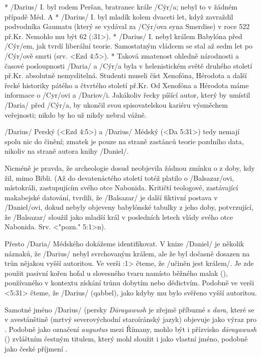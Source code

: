 * \x/Darius/ I. byl rodem Peršan, bratranec krále \x/Cýr/a; nebyl to v žádném případě Méd.
  \insertCite A\right
* \x/Darius/ I. byl mladík kolem dvaceti let, když zavraždil podvodníka Gaumatu (který se vydával za \x/Cýr/ova syna Smerdise) v roce 522 př.Kr.  Nemohlo mu být 62 (:31>). 
* \x/Darius/ I. nebyl králem Babylóna před \x/Cýr/em, jak tvrdí liberální teorie. Samostatným vládcem se stal až sedm let po \x/Cýr/ově smrti (srv. <Ezd 4:5>).
* Taková zmatenost ohledně národnosti a časové posloupnosti \x/Daria/ a \x/Cýr/a byla v helenistickém světě druhého století př.Kr. absolutně nemyslitelná.
Studenti museli číst Xenofóna,  Hérodota a další řecké historiky pátého a čtvrtého století př.Kr. Od Xenofóna a Hérodota máme informace o \x/Cyr/ovi a \x/Dariov/i.
Jakákoliv řecky píšící autor, který by umístil \x/Daria/ před \x/Cýr/a, by ukončil svou spisovatelskou kariéru výsměchem veřejnosti; nikdo by ho už nikdy nebral vážně.  

\enditems

\x/Darius/ Perský (<Ezd 4:5>) a \x/Darius/ Médský (<Da 5:31>) tedy nemají spolu nic do činění; zmatek je pouze na straně zastánců teorie pozdního data, nikoliv na straně autora knihy \x/Daniel/.

Nicméně je pravda, že archeologie dosud neobjevila žádnou zmínku o  z doby, kdy žil, mimo Bibli.
(Až do devatenáctého století totéž platilo o \x/Balsazar/ovi, místokráli, zastupujícím svého otce Nabonida. Kritičtí teologové, zastávající makabejské datování, tvrdili, že
\x/Balsazar/ je další fiktivní postava v \x/Daniel/ovi, dokud nebyly objeveny babylónské tabulky z jeho doby,  potvrzující, že \x/Balsazar/ sloužil jako mladší král v posledních letech vlády svého otce Nabonida. Srv. <"pozn." 5:1>n).

Přesto \x/Daria/ Médského dokážeme identifikovat.
V knize \x/Daniel/ je několik náznaků, že \x/Darius/ nebyl svrchovaným králem, ale že byl dočasně dosazen na trůn nějakou vyšší autoritou.
Ve verši :1> čteme, že \x/učiněn jest králem/. Je zde použit pasivní kořen hofal u slovesného tvaru  namísto běžného malak (), používaného v kontextu získání trůnu dobytím nebo dědictvím.
Podobně ve verši <5:31> čteme, že \x/Darius/  (qabbel), jako kdyby mu bylo svěřeno vyšší autoritou.

Samotné jméno \x/Darius/ (persky {\it D\oldaccents\=arayawush\/} je zřejmě příbuzné s {\it dara,\/} které se v avestánštině (mrtvý severovýchodní staroíránský jazyk) objevuje jako
výraz pro . Podobně jako označení {\it augustus\/} mezi Římany, mohlo být i přízvisko {\it d\oldaccents\=arayawush\/} () zvláštním čestným titulem, který
mohl sloužit i jako vlastní jméno, podobně jako české příjmení .

